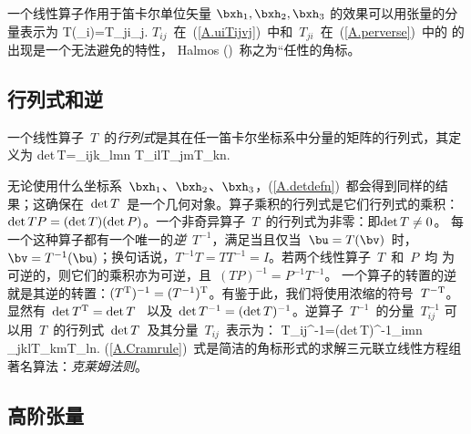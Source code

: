 一个线性算子作用于笛卡尔单位矢量 $\bxh_1,\bxh_2,\bxh_3$ 的效果可以用张量的分量表示为
\eq \label{A.perverse}
T(\bxh_i)=T_{ji}\bxh_j.
\en
$T_{ij}$~在~(\ref{A.uiTijvj})~中和~$T_{ji}$~在~(\ref{A.perverse})~中的 的出现是一个无法避免的特性，
Halmos (\citeyear{halmos58})~称之为“任性的角标。

\subsection{行列式和逆}
%
%
%

一个线性算子~$T$~的{\em 行列式\/}是其在任一笛卡尔坐标系中分量的矩阵的行列式，其定义为
\eq \label{A.detdefn}
{\rm det}\,T=\sixth\eps_{ijk}\eps_{lmn}
T_{il}T_{jm}T_{kn}.
\en

无论使用什么坐标系~$\bxh_1$、$\bxh_2$、$\bxh_3$，(\ref{A.detdefn})~都会得到同样的结果；这确保在~${\rm det}\,T$~是一个几何对象。算子乘积的行列式是它们行列式的乘积：
${\rm det}\,TP=({\rm det}\,T)({\rm det}\,P)$。一个非奇异算子~$T$~的行列式为非零：即${\rm det}\,T\neq 0$。
每一个这种算子都有一个唯一的{\em 逆\/}~$T^{-1}$，满足当且仅当~$\bu=T(\bv)$~时， $\bv=T^{-1}(\bu)$；换句话说，$T^{-1}T=TT^{-1}=I$。若两个线性算子~$T$~和~$P$~均 为可逆的，则它们的乘积亦为可逆，且~$(TP)^{-1}=P^{-1}T^{-1}$。
一个算子的转置的逆就是其逆的转置：$(T^{\rm T})^{-1}
=(T^{-1})^{\rm T}$。有鉴于此，我们将使用浓缩的符号~$T^{-{\rm T}}$。显然有~${\rm det}\,T^{\rm T}={\rm det}\,T$~
以及~${\rm det}\,T^{-1}=({\rm det}\,T)^{-1}$。逆算子~$T^{-1}$~的分量~$T_{ij}^{-1}$ 可以用~$T$~的行列式~${\rm det}\,T$~及其分量~$T_{ij}$~表示为：
\eq \label{A.Cramrule}
T_{ij}^{-1}=\half({\rm det}\,T)^{-1}\varepsilon_{imn}
\varepsilon_{jkl}T_{km}T_{ln}.
\en
(\ref{A.Cramrule})~式是简洁的角标形式的求解三元联立线性方程组著名算法：{\em 克莱姆法则\/}。
%
%
%
%
%
%

\subsection{高阶张量}
%
%

